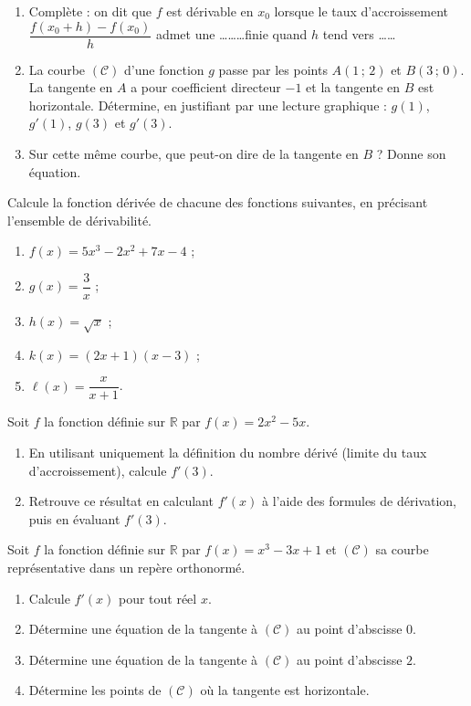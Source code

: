 \documentclass[11pt]{article}
\newcounter{popsec}
\newcounter{popsub}
\newcommand{\courssub}[1]{%
  \stepcounter{popsub}%
  \par\vspace{9pt}\noindent{\popxbold\fontsize{11.5}{13}\selectfont\color{popink}{\color{poporange}\thepopsec.\thepopsub}\hspace{6pt}#1}\par\nopagebreak\vspace{4pt}
}
\begin{document}
\begin{exercice}
\begin{enumerate}
\item Complète : on dit que $f$ est dérivable en $x_0$ lorsque le taux d'accroissement $\dfrac{f(x_0+h)-f(x_0)}{h}$ admet une \ldots\ldots\ldots finie quand $h$ tend vers \ldots\ldots
\item La courbe $(\mathcal{C})$ d'une fonction $g$ passe par les points $A(1\,;\,2)$ et $B(3\,;\,0)$. La tangente en $A$ a pour coefficient directeur $-1$ et la tangente en $B$ est horizontale. Détermine, en justifiant par une lecture graphique : $g(1)$, $g'(1)$, $g(3)$ et $g'(3)$.
\item Sur cette même courbe, que peut-on dire de la tangente en $B$ ? Donne son équation.
\end{enumerate}
\end{exercice}

\begin{exercice}
Calcule la fonction dérivée de chacune des fonctions suivantes, en précisant l'ensemble de dérivabilité.
\begin{enumerate}
\item $f(x)=5x^3-2x^2+7x-4$ ;
\item $g(x)=\dfrac{3}{x}$ ;
\item $h(x)=\sqrt{x}$ ;
\item $k(x)=(2x+1)(x-3)$ ;
\item $\ell(x)=\dfrac{x}{x+1}$.
\end{enumerate}
\end{exercice}

\courssub{Je m'entraîne}

\begin{exercice}
Soit $f$ la fonction définie sur $\mathbb{R}$ par $f(x)=2x^2-5x$.
\begin{enumerate}
\item En utilisant uniquement la définition du nombre dérivé (limite du taux d'accroissement), calcule $f'(3)$.
\item Retrouve ce résultat en calculant $f'(x)$ à l'aide des formules de dérivation, puis en évaluant $f'(3)$.
\end{enumerate}
\end{exercice}

\begin{exercice}
Soit $f$ la fonction définie sur $\mathbb{R}$ par $f(x)=x^3-3x+1$ et $(\mathcal{C})$ sa courbe représentative dans un repère orthonormé.
\begin{enumerate}
\item Calcule $f'(x)$ pour tout réel $x$.
\item Détermine une équation de la tangente à $(\mathcal{C})$ au point d'abscisse $0$.
\item Détermine une équation de la tangente à $(\mathcal{C})$ au point d'abscisse $2$.
\item Détermine les points de $(\mathcal{C})$ où la tangente est horizontale.
\end{enumerate}
\end{exercice}
\end{document}
